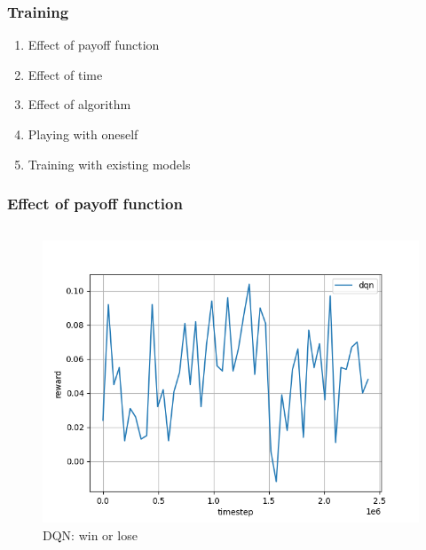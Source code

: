 \begin{frame}
\frametitle{Training}
\begin{enumerate}
\item Effect of payoff function
\item Effect of time
\item Effect of algorithm
\item Playing with oneself
\item Training with existing models
\end{enumerate}
\end{frame}


\begin{frame}
\frametitle{Effect of payoff function}

\begin{columns}[t]

\begin{column}{.5\textwidth}
\begin{figure}
\includegraphics[height=.5\textheight]{dqn-no-specific-payoff.png}
\caption{DQN: win or lose}
\end{figure}
\end{column}


\end{columns}
\end{frame}
